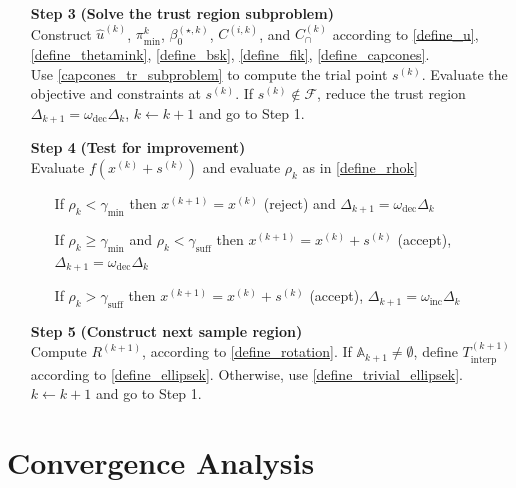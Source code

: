 \documentclass{article}
\theoremstyle{case}
\numberwithin{theorem}{subsection}
\newcommand{\activeconstraintskpo}{{\mathbb A_{k+1}}}
\newcommand{\bsk}{{\beta_0^{(\star, k)}}}
\newcommand{\capcones}{{C^{(k)}_{\cap}}}
\newcommand{\dk}{\Delta_k}
\newcommand{\dkpo}{\Delta_{k+1}}
\newcommand{\feasible}{{\mathcal F}}
\newcommand{\gammabi}{\gamma_{\textrm{suff}}}
\newcommand{\gammasm}{\gamma_{\textrm{min}}}
\newcommand{\huk}{{{\hat u}^{(k)}}}
\newcommand{\mfk}{{{m}_f}^{(k)}}
\newcommand{\omegadec}{\omega_{\text{dec}}}
\newcommand{\omegainc}{\omega_{\text{inc}}}
\newcommand{\rk}{\rho_k}
\newcommand{\rotk}{{R^{(k+1)}}}
\newcommand{\sampletrkpo}{{T_{\text{interp}}^{(k+1)}}}
\newcommand{\sk}{{{s}^{(k)}}}
\newcommand{\thetamink}{{\pi^k_{\textrm{min}}}}
\newcommand{\xkpo}{{{x}^{(k+1)}}}
\newcommand{\xk}{x^{(k)}}
\newcommand{\zik}{{z^{(i, k)}}}
\newcommand{\fik}{{C^{(i, k)}}}
\begin{document}
\begin{algorithm}[H]
\begin{itemize}
        \item[\textbf{Step 3}] \textbf{(Solve the trust region subproblem)} \\
        	Construct $\huk$, $\thetamink$, $\bsk$, $\fik$, and $\capcones$ according to
        	\cref{define_u}, \cref{define_thetamink}, \cref{define_bsk}, \cref{define_fik}, \cref{define_capcones}. \\
        	Use \cref{capcones_tr_subproblem} to compute the trial point $\sk$.
        	Evaluate the objective and constraints at $\sk$.
        	If $\sk \not \in \feasible$, reduce the trust region $\Delta_{k+1} = \omegadec\dk$, $k \gets k+1$ and go to Step 1.
            
        \item[\textbf{Step 4}] \textbf{(Test for improvement)} \\
            Evaluate $f(\xk + \sk)$ and evaluate $\rk$ as in \cref{define_rhok} \begin{itemize}
                \item[] If $\rk < \gammasm$ then $\xkpo=\xk$ (reject) and $\Delta_{k+1} = \omegadec\dk$
                \item[] If $\rk \ge \gammasm$ and $\rk < \gammabi$ then $\xkpo=\xk+\sk$ (accept), $\Delta_{k+1} = \omegadec\dk$
                \item[] If $\rk > \gammabi$ then $\xkpo=\xk+\sk$ (accept), $\Delta_{k+1} = \omegainc\dk$
            \end{itemize}
            
        \item[\textbf{Step 5}] \textbf{(Construct next sample region)} \\
        	Compute $\rotk$, according to \cref{define_rotation}.
        	If $\activeconstraintskpo \ne \emptyset$, define $\sampletrkpo$ according to \cref{define_ellipsek}.
        	Otherwise, use \cref{define_trivial_ellipsek}. \\
            $k \gets k+1$ and go to Step 1.
    \end{itemize}
\end{algorithm}

\section{Convergence Analysis}
\end{document}

